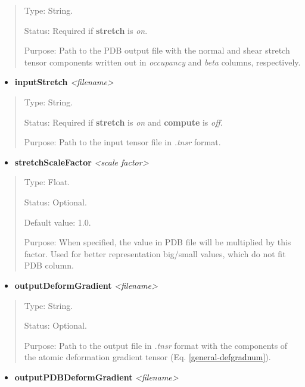 \documentclass[letterpaper,10pt,english]{sphinxmanual}
\begin{document}
\begin{quote}

Type: String.

Status: Required if \textbf{stretch} is \emph{on}.

Purpose:  Path to the PDB output file with the normal and shear stretch tensor components written out in \emph{occupancy} and \emph{beta} columns, respectively.
\end{quote}
\begin{itemize}
\item {} 
\textbf{inputStretch} \emph{\textless{}filename\textgreater{}}

\end{itemize}
\begin{quote}

Type: String.

Status: Required if \textbf{stretch} is \emph{on} and \textbf{compute} is \emph{off}.

Purpose:  Path to the input tensor file in \emph{.tnsr} format.
\end{quote}
\begin{itemize}
\item {} 
\textbf{stretchScaleFactor} \emph{\textless{}scale factor\textgreater{}}

\end{itemize}
\begin{quote}

Type: Float.

Status: Optional.

Default value: 1.0.

Purpose: When specified, the value in PDB file will be multiplied by this factor. Used for better representation big/small values, which do not fit PDB column.
\end{quote}
\begin{itemize}
\item {} 
\textbf{outputDeformGradient} \emph{\textless{}filename\textgreater{}}

\end{itemize}
\begin{quote}

Type: String.

Status: Optional.

Purpose:  Path to the output file in \emph{.tnsr} format with the components of the atomic deformation gradient tensor (Eq. \eqref{general-defgradnum}).
\end{quote}
\begin{itemize}
\item {} 
\textbf{outputPDBDeformGradient} \emph{\textless{}filename\textgreater{}}

\end{itemize}
\end{document}
